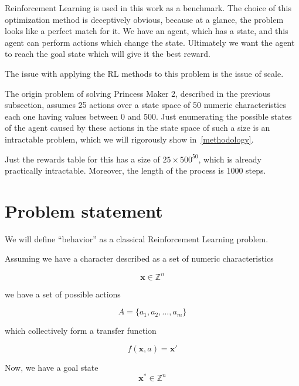 \documentclass[11pt, a4paper]{article}
\begin{document}
	Reinforcement Learning \cite{sutton2018reinforcement} is used in this work as a benchmark.
	The choice of this optimization method is deceptively obvious, because at a glance, the problem looks like a perfect match for it.
	We have an agent, which has a state, and this agent can perform actions which change the state.
	Ultimately we want the agent to reach the goal state which will give it the best reward.
	
	The issue with applying the RL methods to this problem is the issue of scale.

	The origin problem of solving Princess Maker 2, described in the previous subsection,  assumes 25 actions over a state space of 50 numeric characteristics each one having values between 0 and 500.
	Just enumerating the possible states of the agent caused by these actions in the state space of such a size is an intractable problem, which we will rigorously show in~\ref{methodology}.
	
	Just the rewards table for this has a size of $25 \times 500^{50}$, which is already practically intractable.
	Moreover, the length of the process is 1000 steps.

	\section{Problem statement}\label{problem-statement}

	We will define ``behavior'' as a classical Reinforcement Learning\cite{sutton2018reinforcement} problem.

	Assuming we have a character described as a set of numeric characteristics
	
	\begin{equation}
		\mathbf{x} \in \mathbb{Z}^n
	\end{equation}
	
	we have a set of possible actions
	
	\begin{equation}
		A = \{a_1, a_2,\ldots, a_m\}
	\end{equation}
	
	which collectively form a transfer function
	
	\begin{equation}
		f(\mathbf{x}, a) = \mathbf{x}'
	\end{equation}

	Now, we have a goal state 
	\begin{equation}
		\mathbf{x}^* \in \mathbb{Z}^n
	\end{equation} 
	
\end{document}
